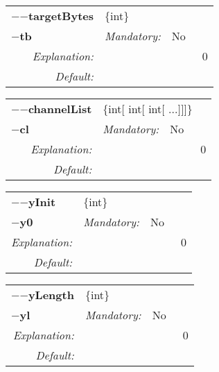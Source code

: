 \begin{center}\begin{tabular}{|rr|rlrl|}
\hline
\multicolumn{2}{|l|}{\textbf{$-$$-$targetBytes}} & \multicolumn{4}{|l|}{$\{$int$\}$} \\
\cline{3-6}
\multicolumn{2}{|l|}{\textbf{$-$tb}} & \emph{Mandatory:} & No & &  \\
\hline
\emph{Explanation:} & \multicolumn{5}{|p{12cm}|}{0} \\
\hline
\emph{Default:} & \multicolumn{5}{|p{12cm}|}{ } \\
\hline
\end{tabular}\end{center}
\begin{center}\begin{tabular}{|rr|rlrl|}
\hline
\multicolumn{2}{|l|}{\textbf{$-$$-$channelList}} & \multicolumn{4}{|l|}{$\{$int$[$ int$[$ int$[$ ...$]$$]$$]$$\}$} \\
\cline{3-6}
\multicolumn{2}{|l|}{\textbf{$-$cl}} & \emph{Mandatory:} & No & &  \\
\hline
\emph{Explanation:} & \multicolumn{5}{|p{12cm}|}{0} \\
\hline
\emph{Default:} & \multicolumn{5}{|p{12cm}|}{ } \\
\hline
\end{tabular}\end{center}
\begin{center}\begin{tabular}{|rr|rlrl|}
\hline
\multicolumn{2}{|l|}{\textbf{$-$$-$yInit}} & \multicolumn{4}{|l|}{$\{$int$\}$} \\
\cline{3-6}
\multicolumn{2}{|l|}{\textbf{$-$y0}} & \emph{Mandatory:} & No & &  \\
\hline
\emph{Explanation:} & \multicolumn{5}{|p{12cm}|}{0} \\
\hline
\emph{Default:} & \multicolumn{5}{|p{12cm}|}{ } \\
\hline
\end{tabular}\end{center}
\begin{center}\begin{tabular}{|rr|rlrl|}
\hline
\multicolumn{2}{|l|}{\textbf{$-$$-$yLength}} & \multicolumn{4}{|l|}{$\{$int$\}$} \\
\cline{3-6}
\multicolumn{2}{|l|}{\textbf{$-$yl}} & \emph{Mandatory:} & No & &  \\
\hline
\emph{Explanation:} & \multicolumn{5}{|p{12cm}|}{0} \\
\hline
\emph{Default:} & \multicolumn{5}{|p{12cm}|}{ } \\
\hline
\end{tabular}\end{center}
